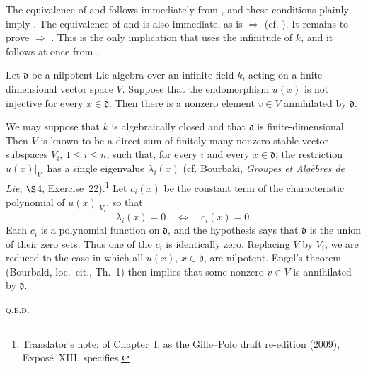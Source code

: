 The equivalence of  and  follows immediately from , and
these conditions plainly imply . The equivalence of  and
 is also immediate, as is  \(\Rightarrow\) 
(cf. ). It remains to prove  \(\Rightarrow\) . This
is the only implication that uses the infinitude of \(k\), and it
follows at once from .

\begin{lemma}
Let \(\mathfrak d\) be a nilpotent Lie algebra over an infinite field
\(k\), acting on a finite-dimensional vector space \(V\). Suppose
that the endomorphism \(u(x)\) is not injective for every
\(x\in\mathfrak d\). Then there is a nonzero element \(v\in V\)
annihilated by \(\mathfrak d\).
\end{lemma}

We may suppose that \(k\) is algebraically closed and that
\(\mathfrak d\) is finite-dimensional. Then \(V\) is known to be a
direct sum of finitely many nonzero stable vector subspaces \(V_i\),
\(1\leq i\leq n\), such that, for every \(i\) and every
\(x\in\mathfrak d\), the restriction \(u(x)|_{V_i}\) has a single
eigenvalue \(\lambda_i(x)\) (cf. Bourbaki, \emph{Groupes et Algèbres
de Lie}, \(\S\)4, Exercise~22).\footnote{Translator's note: of
Chapter~I, as the Gille--Polo draft re-edition (2009), Exposé~XIII,
specifies.} Let \(c_i(x)\) be the
constant term of the characteristic polynomial of
\(u(x)|_{V_i}\), so that
\[
  \lambda_i(x)=0\quad\Longleftrightarrow\quad c_i(x)=0.
\]
Each \(c_i\) is a polynomial function on \(\mathfrak d\), and the
hypothesis says that \(\mathfrak d\) is the union of their zero sets.
Thus one of the \(c_i\) is identically zero. Replacing \(V\) by
\(V_i\), we are reduced to the case in which all \(u(x)\),
\(x\in\mathfrak d\), are nilpotent. Engel's theorem (Bourbaki,
loc.\ cit., Th.~1) then implies that some nonzero \(v\in V\) is
annihilated by \(\mathfrak d\).
\par\hfill\textsc{q.e.d.}

